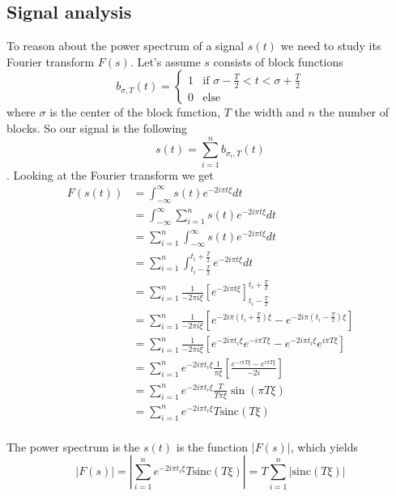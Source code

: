 \documentclass[12pt,a4paper]{article}
\begin{document}
	\subsection{Signal analysis}
	To reason about the power spectrum of a signal $s(t)$ we need to study its Fourier transform $F(s)$.
	Let's assume $s$ consists of block functions
	\begin{equation}
		b_{\sigma, T}(t) = \left\{
		\begin{array}{ll}
			1  & \mbox{if } \sigma-\frac{T}{2} < t < \sigma+\frac{T}{2} \\
			0 & \mbox{else}
		\end{array}
		\right.
	\end{equation}
	 where $\sigma$ is the center of the block function, $T$ the width and $n$ the number of blocks. So our signal is the following
	 \begin{equation}
	 	s(t) = \sum_{i=1}^{n} b_{\sigma_i, T}(t)
	 \end{equation}.
	Looking at the Fourier transform we get	
	\begin{align}
		F(s(t)) & = \int_{-\infty}^{\infty} s(t) e^{-2i \pi t \xi} dt\\
		& = \int_{-\infty}^{\infty}  \sum_{i=1}^{n} s(t) e^{-2i \pi t \xi} dt\\
		& = \sum_{i=1}^{n} \int_{-\infty}^{\infty}  s(t) e^{-2i \pi t \xi} dt\\
		& = \sum_{i=1}^{n} \int_{t_i-\frac{T}{2}}^{t_i + \frac{T}{2}}  e^{-2i \pi t \xi} dt\\
		& = \sum_{i=1}^{n} \frac{1}{-2\pi i \xi}\left[e^{-2i \pi t \xi} \right]_{t_i - \frac{T}{2}}^{t_i + \frac{T}{2}}\\
		& = \sum_{i=1}^{n} \frac{1}{-2\pi i \xi}
		\left[e^{-2i \pi (t_i +\frac{T}{2}) \xi} - e^{-2i \pi (t_i -\frac{T}{2}) \xi}\right]\\
		& = \sum_{i=1}^{n} \frac{1}{-2\pi i \xi}
		\left[e^{-2i \pi t_i \xi} e^{-i \pi T \xi} - e^{-2i \pi t_i  \xi} e^{i \pi T \xi} \right]\\
		& = \sum_{i=1}^{n} e^{-2i \pi t_i \xi} \frac{1}{\pi \xi}
		  \left[ \frac{e^{-i \pi T \xi} - e^{i \pi T \xi}}{-2i} \right]\\
		& = \sum_{i=1}^{n} e^{-2i \pi t_i \xi} \frac{T}{T \pi \xi} \sin(\pi T \xi)\\
		& = \sum_{i=1}^{n} e^{-2i \pi t_i \xi} T \mbox{sinc}(T \xi)\\
	\end{align}
	
	The power spectrum is the $s(t)$ is the function $\left| F(s)\right|$, which yields
	\begin{equation}
		\left|F(s)\right| = \left| \sum_{i=1}^{n} e^{-2i \pi t_i \xi} T \mbox{sinc}(T \xi) \right| = T  \sum_{i=1}^{n} \left| \mbox{sinc}(T \xi) \right|
	\end{equation}
	
\end{document}
